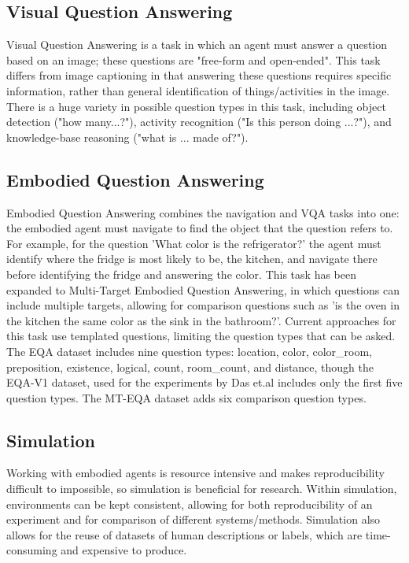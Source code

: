 \documentclass{article}
\begin{document}
\subsection{Visual Question Answering}
Visual Question Answering is a task in which an agent must answer a question based on an image; these questions are "free-form and open-ended"\cite{vqa_2015}. This task differs from image captioning in that answering these questions requires specific information, rather than general identification of things/activities in the image. There is a huge variety in possible question types in this task, including object detection ("how many...?"), activity recognition ("Is this person doing ...?"), and knowledge-base reasoning ("what is ... made of?"). 

\subsection{Embodied Question Answering}
Embodied Question Answering combines the navigation and VQA tasks into one: the embodied agent must navigate to find the object that the question refers to\cite{embodiedqa}. For example, for the question 'What color is the refrigerator?' the agent must identify where the fridge is most likely to be, the kitchen, and navigate there before identifying the fridge and answering the color. This task has been expanded to Multi-Target Embodied Question Answering, in which questions can include multiple targets, allowing for comparison questions such as 'is the oven in the kitchen the same color as the sink in the bathroom?'\cite{eqa_multitarget}. Current approaches for this task use templated questions, limiting the question types that can be asked. The EQA dataset includes nine question types: location, color, color\_room, preposition, existence, logical, count, room\_count, and distance, though the EQA-V1 dataset, used for the experiments by Das et.al includes only the first five question types\cite{embodiedqa}. The MT-EQA dataset adds six comparison question types\cite{eqa_multitarget}.

\subsection{Simulation}
Working with embodied agents is resource intensive and makes reproducibility difficult to impossible, so simulation is beneficial for research. Within simulation, environments can be kept consistent, allowing for both reproducibility of an experiment and for comparison of different systems/methods. Simulation also allows for the reuse of datasets of human descriptions or labels, which are time-consuming and expensive to produce.  
\end{document}
